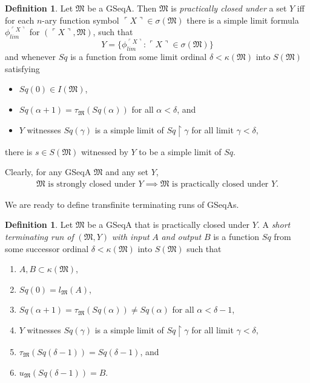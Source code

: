 \documentclass[12pt, twoside]{memoir}
\numberwithin{equation}{section}
\theoremstyle{definition}
\newtheorem{defi}[thm]{Definition}
\theoremstyle{remark}
\theoremstyle{definition}
\theoremstyle{definition}
\theoremstyle{definition}
\theoremstyle{remark}
\begin{document}
\begin{defi}\label{def238}
Let $\mathfrak{M}$ be a GSeqA. Then $\mathfrak{M}$ is \emph{practically closed under} a set $Y$ iff for each $n$-ary function symbol $\ulcorner X \urcorner \in \sigma(\mathfrak{M})$ there is a simple limit formula $\phi_{lim}^{\ulcorner X \urcorner}$ for $(\ulcorner X \urcorner, \mathfrak{M})$, such that 
\begin{equation*}
    Y = \{\phi_{lim}^{\ulcorner X \urcorner} : \ulcorner X \urcorner \in \sigma(\mathfrak{M})\}
\end{equation*}
and whenever $Sq$ is a function from some limit ordinal $\delta < \kappa(\mathfrak{M})$ into $S(\mathfrak{M})$ satisfying
\begin{itemize}
    \item $Sq(0) \in I(\mathfrak{M})$,
    \item $Sq(\alpha + 1) = \tau_{\mathfrak{M}}(Sq(\alpha))$ for all $\alpha < \delta$, and
    \item $Y$ witnesses $Sq(\gamma)$ is a simple limit of $Sq \restriction \gamma$ for all limit $\gamma < \delta$,
\end{itemize}
there is $s \in S(\mathfrak{M})$ witnessed by $Y$ to be a simple limit of $Sq$.
\end{defi}

Clearly, for any GSeqA $\mathfrak{M}$ and any set $Y$,
\begin{align*}
    \mathfrak{M} \text{ is strongly closed under } Y \implies \mathfrak{M} \text{ is practically closed under } Y \text{.}
\end{align*}

We are ready to define transfinite terminating runs of GSeqAs.

\begin{defi}
Let $\mathfrak{M}$ be a GSeqA that is practically closed under $Y$. A \emph{short terminating run of} $(\mathfrak{M}, Y)$ \emph{with input} $A$ \emph{and output} $B$ is a function $Sq$ from some successor ordinal $\delta < \kappa(\mathfrak{M})$ into $S(\mathfrak{M})$ such that 
\begin{enumerate}[label=(\alph*)]
    \item $A, B \subset \kappa(\mathfrak{M})$,
    \item $Sq(0) = l_{\mathfrak{M}}(A)$,
    \item $Sq(\alpha + 1) = \tau_{\mathfrak{M}}(Sq(\alpha)) \neq Sq(\alpha)$ for all $\alpha < \delta - 1$,
    \item $Y$ witnesses $Sq(\gamma)$ is a simple limit of $Sq \restriction \gamma$ for all limit $\gamma < \delta$,
    \item $\tau_{\mathfrak{M}}(Sq(\delta - 1)) = Sq(\delta - 1)$, and
    \item $u_{\mathfrak{M}}(Sq(\delta - 1)) = B$.
\end{enumerate}
\end{defi}
\end{document}

